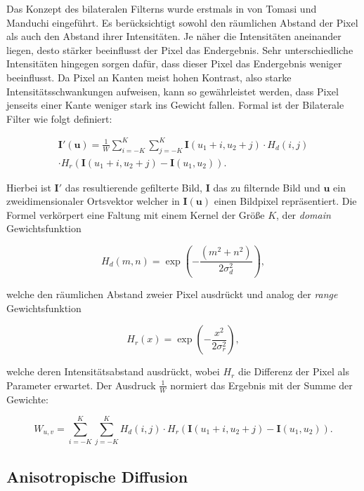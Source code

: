 \documentclass[conference]{IEEEtran}
\begin{document}
Das Konzept des bilateralen Filterns wurde erstmals in \cite{tomasi1998bilateral} von Tomasi und Manduchi eingeführt. 
Es berücksichtigt sowohl den räumlichen Abstand der Pixel als auch den Abstand ihrer Intensitäten. Je näher die Intensitäten aneinander liegen, desto stärker beeinflusst der Pixel das Endergebnis. Sehr unterschiedliche Intensitäten hingegen sorgen dafür, dass dieser Pixel das Endergebnis weniger beeinflusst. 
Da Pixel an Kanten meist hohen Kontrast, also starke Intensitätsschwankungen aufweisen, kann so gewährleistet werden, dass Pixel jenseits einer Kante weniger stark ins Gewicht fallen.
Formal ist der Bilaterale Filter wie folgt definiert:

\begin{eqnarray}
\bm{I'}(\bm u) = \frac {1}{W} \sum_{i = -K}^{K} \sum_{j = -K}^{K} 
\bm I(u_1 + i, u_2 + j) 
\cdot H_d(i, j) \\
\cdot H_r(\bm I(u_1+i, u_2+j) - \bm I(u_1, u_2)).
\end{eqnarray}

Hierbei ist $\bm{I'}$ das resultierende gefilterte Bild, $\bm{I}$ das zu filternde Bild und $\bm{u}$ ein zweidimensionaler Ortsvektor welcher in $\bm I(\bm u)$ einen Bildpixel repräsentiert. Die Formel verkörpert eine Faltung mit einem Kernel der Größe $K$, der \textit{domain} Gewichtsfunktion

\begin{equation}
H_d(m, n) = 
	\exp \left( -
		\frac{ (m^2 + n^2) } {2 \sigma_d^2} 
	\right),
\end{equation}

welche den räumlichen Abstand zweier Pixel ausdrückt und analog der \textit{range} Gewichtsfunktion

\begin{equation}
H_r(x) = 
	\exp \left( -
		\frac{ x^2 } {2 \sigma_r^2} 
	\right),
\end{equation}

welche deren Intensitätsabstand ausdrückt, wobei $H_r$ die Differenz der Pixel als Parameter erwartet. Der Ausdruck $\frac 1{W}$ normiert das Ergebnis mit der Summe der Gewichte:

\begin{equation}
W_{u,v} = \sum_{i = -K}^{K} \sum_{j = -K}^{K} H_d(i,j) \cdot H_r(\bm I(u_1+i, u_2+j) - \bm I(u_1, u_2)).
\end{equation}


\subsection{Anisotropische Diffusion}
\end{document}
